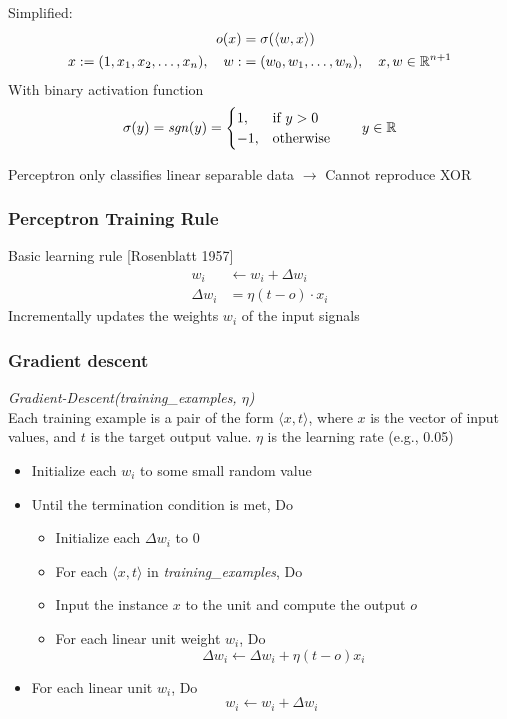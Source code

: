 Simplified:
\begin{align*}
  o(x) &= \sigma (\langle w, x \rangle)\\
  x := (1, x_1, x_2, \ldots, x_n), \quad w :&= (w_0, w_1, \ldots, w_n), \quad x,w \in \mathbb{R}^{n+1}
\end{align*}
With binary activation function
\[
  \sigma (y) = \mathit{sgn}(y) = \begin{cases} 1, & \text{if } y > 0\\ -1, & \text{otherwise}\end{cases}
  \qquad y \in \mathbb{R}
\]

Perceptron only classifies linear separable data \(\rightarrow\) Cannot reproduce XOR

\subsubsection{Perceptron Training Rule}%
\label{nn:ssub:perceptron_training_rule}
Basic learning rule [Rosenblatt 1957]
\begin{align*}
  w_i &\leftarrow w_i + \Delta w_i\\
  \Delta w_i &= \eta (t-o) \cdot x_i
\end{align*}
Incrementally updates the weights \(w_i\) of the input signals\\

\subsubsection{Gradient descent}%
\label{nn:ssub:gradient_descent}
\textit{Gradient-Descent(training\_examples, \(\eta\))}\\
Each training example is a pair of the form \(\langle x, t\rangle\), where \(x\) is the vector of input
values, and \(t\) is the target output value. \(\eta\) is the learning rate (e.g., 0.05)
\begin{itemize}
\item Initialize each \(w_i\) to some small random value
\item Until the termination condition is met, Do
  \begin{itemize}
  \item Initialize each \(\Delta w_i\) to 0
  \item For each \(\langle x, t \rangle\) in \textit{training\_examples}, Do
  \item Input the instance \(x\) to the unit and compute the output \(o\)
  \item For each linear unit weight \(w_i\), Do
    \[\Delta w_i \leftarrow \Delta w_i + \eta (t - o) x_i\]
  \end{itemize}
\item For each linear unit \(w_i\), Do
  \[w_i \leftarrow w_i + \Delta w_i\]
\end{itemize}

